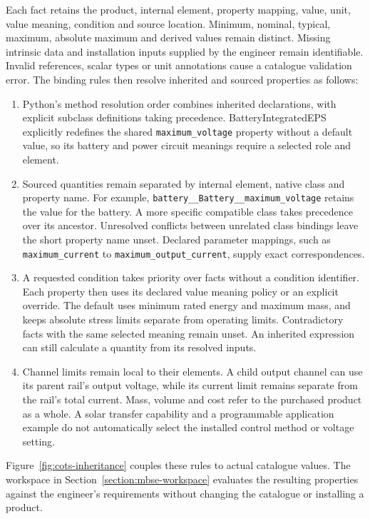 Each fact retains the product, internal element, property mapping, value, unit, value meaning, condition and source location.
Minimum, nominal, typical, maximum, absolute maximum and derived values remain distinct.
Missing intrinsic data and installation inputs supplied by the engineer remain identifiable.
Invalid references, scalar types or unit annotations cause a catalogue validation error.
The binding rules then resolve inherited and sourced properties as follows:
\begin{enumerate}
\item Python's method resolution order combines inherited declarations, with explicit subclass definitions taking precedence.
BatteryIntegratedEPS explicitly redefines the shared \texttt{maximum\_voltage} property without a default value, so its battery and power circuit meanings require a selected role and element.
\item Sourced quantities remain separated by internal element, native class and property name.
For example, \texttt{battery\_\_Battery\_\_maximum\_voltage} retains the value for the battery.
A more specific compatible class takes precedence over its ancestor.
Unresolved conflicts between unrelated class bindings leave the short property name unset.
Declared parameter mappings, such as \texttt{maximum\_current} to \texttt{maximum\_output\_current}, supply exact correspondences.
\item A requested condition takes priority over facts without a condition identifier.
Each property then uses its declared value meaning policy or an explicit override.
The default uses minimum rated energy and maximum mass, and keeps absolute stress limits separate from operating limits.
Contradictory facts with the same selected meaning remain unset.
An inherited expression can still calculate a quantity from its resolved inputs.
\item Channel limits remain local to their elements.
A child output channel can use its parent rail's output voltage, while its current limit remains separate from the rail's total current.
Mass, volume and cost refer to the purchased product as a whole.
A solar transfer capability and a programmable application example do not automatically select the installed control method or voltage setting.
\end{enumerate}

Figure~\ref{fig:cots-inheritance} couples these rules to actual catalogue values.
The workspace in Section~\ref{section:mbse-workspace} evaluates the resulting properties against the engineer's requirements without changing the catalogue or installing a product.

